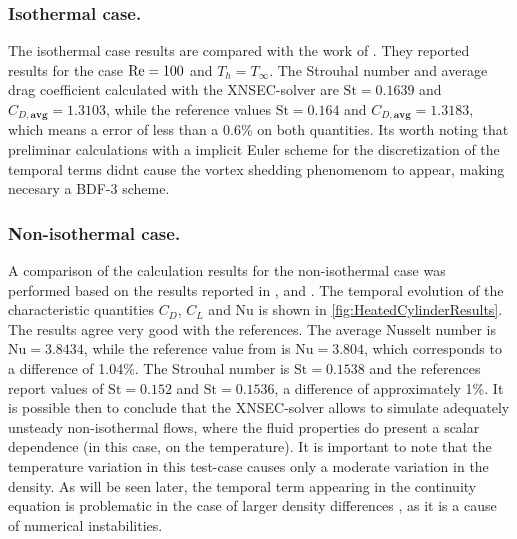 \subsubsection{Isothermal case.}
The isothermal case results are compared with the work of \cite{sharmaHEATFLUIDFLOW2004}. They reported results for the case $\text{Re} = 100$ and $T_h = T_\infty$. The Strouhal number and average drag coefficient calculated with the XNSEC-solver are $\text{St} = 0.1639$ and $C_{D,\textbf{avg}} = 1.3103$, while the reference values $\text{St} = 0.164$ and $C_{D,\textbf{avg}} = 1.3183$, which means a error of less than a 0.6\% on both quantities. Its worth noting that preliminar calculations with a implicit Euler scheme for the discretization of the temporal terms didnt cause the vortex shedding phenomenom to appear, making necesary a BDF-3 scheme.
\subsubsection{Non-isothermal case.}
A comparison of the calculation results for the non-isothermal case was performed based on the results reported in \cite{shiHeatingEffectSteady2004}, \cite{wangRelationshipEffectiveReynolds2000} and \cite{henninkLowMachNumberFlow2022}.
The temporal evolution of the characteristic quantities $C_D$, $C_L$ and Nu is shown in \cref{fig:HeatedCylinderResults}. The results agree very good with the references. The average Nusselt number is  $\text{Nu} = 3.8434$, while the reference value from \cite{henninkLowMachNumberFlow2022} is $\text{Nu} = 3.804$, which corresponds to a difference of 1.04\%. The Strouhal number is $\text{St} = 0.1538$ and the references report values of $\text{St} = 0.152$ and $\text{St} = 0.1536$, a difference of approximately 1\%. It is possible then to conclude that the XNSEC-solver allows to simulate adequately unsteady non-isothermal flows, where the fluid properties do present a scalar dependence (in this case, on the temperature). It is important to note that the temperature variation in this test-case causes only a moderate variation in the density. As will be seen later, the temporal term appearing in the continuity equation is problematic in the case of larger density differences \citep{knikkerComparativeStudyHighorder2011}, as it is a cause of numerical instabilities.




\FloatBarrier
